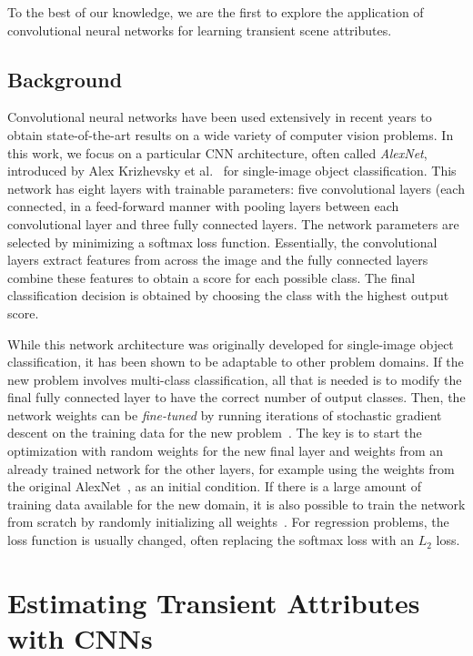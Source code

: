 \documentclass[10pt,twocolumn,letterpaper]{article}
\begin{document}
To the best of our knowledge, we are the first to explore the application of
convolutional neural networks for learning transient scene attributes.

\subsection{Background}

Convolutional neural networks have been used extensively in recent years to
obtain state-of-the-art results on a wide variety of computer vision problems.
In this work, we focus on a particular CNN architecture, often called {\em
AlexNet}, introduced by Alex Krizhevsky et al.~\cite{caffenetnips12} for
single-image object classification. This network has eight layers with
trainable parameters: five convolutional layers (each connected, in a
feed-forward manner with pooling layers between each convolutional layer and
three fully connected layers. The network parameters are selected by minimizing
a softmax loss function. Essentially, the convolutional layers extract features
from across the image and the fully connected layers combine these features to
obtain a score for each possible class. The final classification decision is
obtained by choosing the class with the highest output score.  

While this network architecture was originally developed for single-image
object classification, it has been shown to be adaptable to other problem
domains. If the new problem involves multi-class classification, all that is
needed is to modify the final fully connected layer to have the correct number
of output classes. Then, the network weights can be {\em fine-tuned} by running
iterations of stochastic gradient descent on the training data for the new
problem~\cite{yosinski2014transferable}.  The key is to start the optimization
with random weights for the new final layer and weights from an already trained
network for the other layers, for example using the weights from the original
AlexNet~\cite{caffenetnips12}, as an initial condition. If there is a large
amount of training data available for the new domain, it is also possible to
train the network from scratch by randomly initializing all
weights~\cite{zhou2014places}.  For regression problems, the loss
function is usually changed, often replacing the softmax loss with an
$L_2$ loss.

\section{Estimating Transient Attributes with CNNs}
\label{sec:method}
\end{document}
